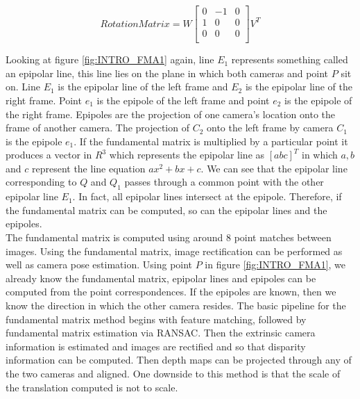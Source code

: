 \begin{equation} \label{eqn:FundaRote}
Rotation Matrix = W\left[
\begin{array}{ccc}
0 & -1 & 0 \\
1 & 0 & 0 \\
0 & 0 & 0 \\
\end{array}
\right]V^{T}
\end{equation}

Looking at figure \ref{fig:INTRO_FMA1} again, line $E_1$ represents something called an epipolar line, this line lies on the plane in which both cameras and point $P$ sit on. Line $E_1$ is the epipolar line of the left frame and $E_2$ is the epipolar line of the right frame. Point $e_1$ is the epipole of the left frame and point $e_2$ is the epipole of the right frame. Epipoles are the projection of one camera's location onto the frame of another camera. The projection of $C_2$ onto the left frame by camera $C_1$ is the epipole $e_1$. If the fundamental matrix is multiplied by a particular point it produces a vector in $R^3$ which represents the epipolar line as $[a b c]^T$ in which $a,b$ and $c$ represent the line equation $ax^2 + bx + c$. We can see that the epipolar line corresponding to $Q$ and $Q_1$ passes through a common point with the other epipolar line $E_1$. In fact, all epipolar lines intersect at the epipole. Therefore, if the fundamental matrix can be computed, so can the epipolar lines and the epipoles. \\

The fundamental matrix is computed using around 8 point matches between images. Using the fundamental matrix, image rectification can be performed as well as camera pose estimation. Using point $P$ in figure \ref{fig:INTRO_FMA1}, we already know the fundamental matrix, epipolar lines and epipoles can be computed from the point correspondences. If the epipoles are known, then we know the direction in which the other camera resides. The basic pipeline for the fundamental matrix method begins with feature matching, followed by fundamental matrix estimation via RANSAC. Then the extrinsic camera information is estimated and images are rectified and so that disparity information can be computed. Then depth maps can be projected through any of the two cameras and aligned. One downside to this method is that the scale of the translation computed is not to scale. \\


